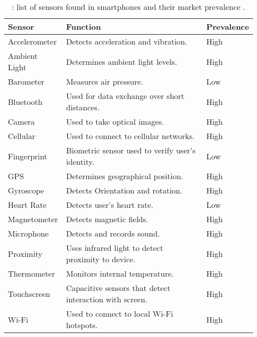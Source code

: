 \begin{table}[]
    \begin{tabular}{lll}
    \hline
    \textbf{Sensor} & \textbf{Function}                                       & \textbf{Prevalence} \\ \hline
    Accelerometer   & Detects acceleration and vibration.                     & High                \\
    Ambient Light   & Determines ambient light levels.                        & High                \\
    Barometer       & Measures air pressure.                                  & Low                 \\
    Bluetooth       & Used for data exchange over short distances.            & High                \\
    Camera          & Used to take optical images.                            & High                \\
    Cellular        & Used to connect to cellular networks.                   & High                \\
    Fingerprint     & Biometric sensor used to verify user’s identity.        & Low                 \\
    GPS             & Determines geographical position.                       & High                \\
    Gyroscope       & Detects Orientation and rotation.                       & High                \\
    Heart Rate      & Detects user’s heart rate.                              & Low                 \\
    Magnetometer    & Detects magnetic fields.                                & High                \\
    Microphone      & Detects and records sound.                              & High                \\
    Proximity       & Uses infrared light to detect proximity to device.      & High                \\
    Thermometer     & Monitors internal temperature.                          & High                \\
    Touchscreen     & Capacitive sensors that detect interaction with screen. & High                \\
    Wi-Fi           & Used to connect to local Wi-Fi hotspots.                & High                \\ \hline
    \end{tabular}
    \caption{: list of sensors found in smartphones and their market prevalence \cite{Priyadarshini2018}.}
    \label{tab:lit_sensors}
\end{table}

